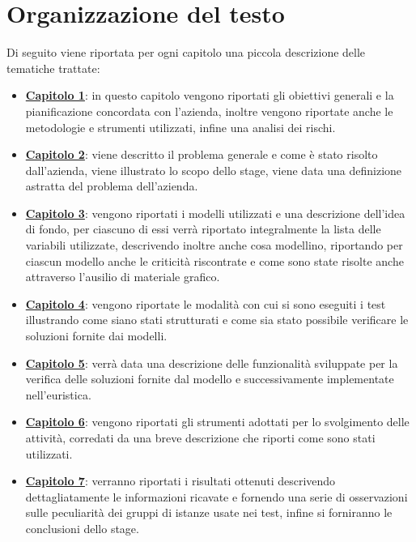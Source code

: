 \section{Organizzazione del testo}
Di seguito viene riportata per ogni capitolo una piccola descrizione delle tematiche trattate:
\begin{itemize}
    \item \hyperlink{(chap:processi_metodologie)}{\textbf{Capitolo 1}}: in questo capitolo vengono riportati gli obiettivi generali e la pianificazione concordata con l'azienda, inoltre vengono riportate anche le metodologie e strumenti utilizzati, infine una analisi dei rischi.
    \item \hyperlink{(chap:inquadramento)}{\textbf{Capitolo 2}}: viene descritto il problema generale e come è stato risolto dall'azienda, viene illustrato lo scopo dello stage, viene data una definizione astratta del problema dell'azienda.
    \item \hyperlink{(chap:processi_metodologie)}{\textbf{Capitolo 3}}: vengono riportati i modelli utilizzati e una descrizione dell'idea di fondo, per ciascuno di essi verrà riportato integralmente la lista delle variabili utilizzate, descrivendo inoltre anche cosa modellino, riportando per ciascun modello anche le criticità riscontrate e come sono state risolte anche attraverso l'ausilio di materiale grafico.
    \item \hyperlink{(chap:processi_metodologie)}{\textbf{Capitolo 4}}: vengono riportate le modalità con cui si sono eseguiti i test illustrando come siano stati strutturati e come sia stato possibile verificare le soluzioni fornite dai modelli.
    \item \hyperlink{(chap:processi_metodologie)}{\textbf{Capitolo 5}}: verrà data una descrizione delle funzionalità sviluppate per la verifica delle soluzioni fornite dal modello e successivamente implementate nell'euristica.
    \item \hyperlink{(chap:processi_metodologie)}{\textbf{Capitolo 6}}: vengono riportati gli strumenti adottati per lo svolgimento delle attività, corredati da una breve descrizione che riporti come sono stati utilizzati.
    \item \hyperlink{(chap:processi_metodologie)}{\textbf{Capitolo 7}}: verranno riportati i risultati ottenuti descrivendo dettagliatamente le informazioni ricavate e fornendo una serie di osservazioni sulle peculiarità dei gruppi di istanze usate nei test, infine si forniranno le conclusioni dello stage.
\end{itemize}
